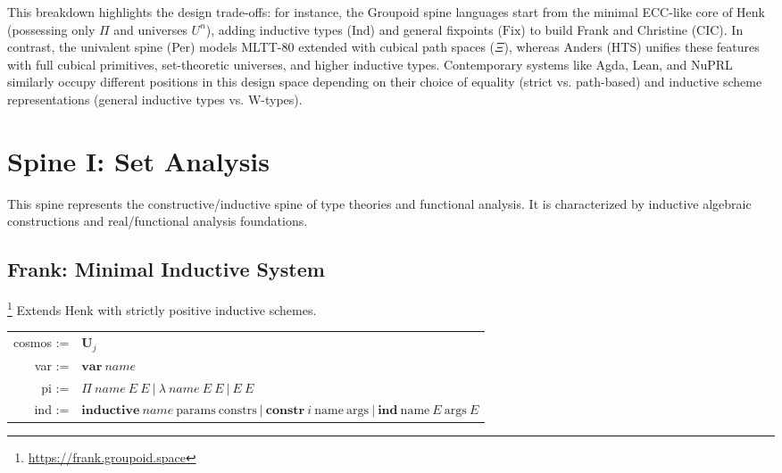 \documentclass{article}
\theoremstyle{definition}
\theoremstyle{plain}
\begin{document}
This breakdown highlights the design trade-offs: for instance, the Groupoid spine languages start from the minimal ECC-like core of Henk (possessing only $\Pi$ and universes $U^n$), adding inductive types ($\mathrm{Ind}$) and general fixpoints ($\mathrm{Fix}$) to build Frank and Christine (CIC). In contrast, the univalent spine (Per) models MLTT-80 extended with cubical path spaces ($\Xi$), whereas Anders (HTS) unifies these features with full cubical primitives, set-theoretic universes, and higher inductive types. Contemporary systems like Agda, Lean, and NuPRL similarly occupy different positions in this design space depending on their choice of equality (strict vs. path-based) and inductive scheme representations (general inductive types vs. W-types).

\newpage
\section{Spine I: Set Analysis}
This spine represents the constructive/inductive spine of type theories and functional analysis. It is characterized by inductive algebraic constructions and real/functional analysis foundations.

\subsection{Frank: Minimal Inductive System \cite{Pfenning89}}\footnote{\url{https://frank.groupoid.space}}
Extends Henk with strictly positive inductive schemes.
\begin{table}[ht!]
\centering
\begin{tabular}{rl}
 cosmos :=&$\textbf{U}_j$ \\
    var :=&$\textbf{var}\ name$ \\
     pi :=&$\Pi\ name\ E\ E\ |\ \lambda\ name\ E\ E\ |\ E\ E$ \\
    ind :=&$\textbf{inductive}\ name\ \textrm{params}\ \textrm{constrs}\ |\ \textbf{constr}\ i\ \textrm{name}\ \textrm{args}\ |\ \textbf{ind}\ \textrm{name}\ E\ \textrm{args}\ E$ \\
\end{tabular}
\end{table}
\end{document}
